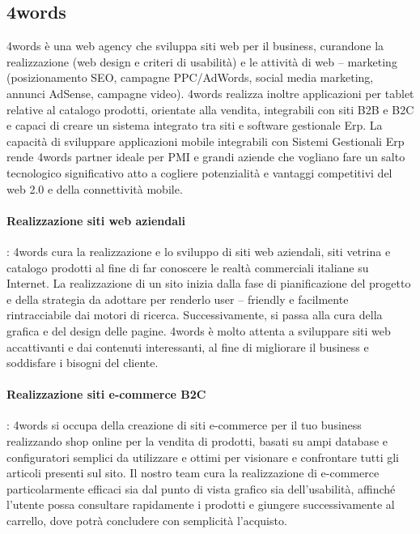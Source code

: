 \subsection{4words}
4words è una web agency che sviluppa siti web per il business, curandone la realizzazione (web design e criteri di usabilità) e le attività di web – marketing (posizionamento \Gls{SEO}, campagne \Gls{PPC}/AdWords, social media marketing, annunci AdSense, campagne video).
4words realizza inoltre applicazioni per tablet relative al catalogo prodotti, orientate alla vendita, integrabili con siti B2B e B2C e capaci di creare un sistema integrato tra siti e software gestionale Erp.
La capacità di sviluppare applicazioni mobile integrabili con Sistemi Gestionali Erp rende 4words partner ideale per \Gls{PMI} e grandi aziende che vogliano fare un salto tecnologico significativo atto a cogliere potenzialità e vantaggi competitivi del web 2.0 e della connettività mobile.

\paragraph{Realizzazione siti web aziendali}: 4words cura la realizzazione e lo sviluppo di siti web aziendali, siti vetrina e catalogo prodotti al fine di far conoscere le realtà commerciali italiane su Internet. La realizzazione di un sito inizia dalla fase di pianificazione del progetto e della strategia da adottare per renderlo user – friendly e facilmente rintracciabile dai motori di ricerca. Successivamente, si passa alla cura della grafica e del design delle pagine. 4words è molto attenta a sviluppare siti web accattivanti e dai contenuti interessanti, al fine di migliorare il business e soddisfare i bisogni del cliente.

\paragraph{Realizzazione siti e-commerce B2C}: 4words si occupa della creazione di siti e-commerce per il tuo business realizzando shop online per la vendita di prodotti, basati su ampi database e configuratori semplici da utilizzare e ottimi per visionare e confrontare tutti gli articoli presenti sul sito. Il nostro team cura la realizzazione di e-commerce particolarmente efficaci sia dal punto di vista grafico sia dell'usabilità, affinché l'utente possa consultare rapidamente i prodotti e giungere successivamente al carrello, dove potrà concludere con semplicità l'acquisto.

